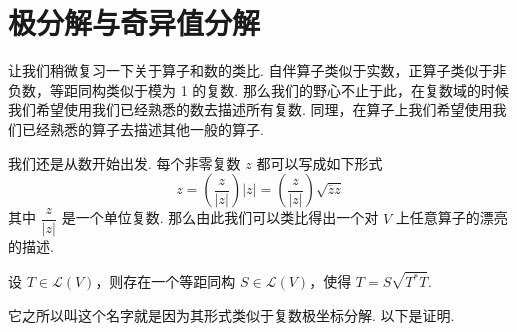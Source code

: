 \chapter{极分解与奇异值分解}

让我们稍微复习一下关于算子和数的类比. 自伴算子类似于实数，正算子类似于非负数，等距同构类似于模为 1 的复数. 那么我们的野心不止于此，在复数域的时候我们希望使用我们已经熟悉的数去描述所有复数. 同理，在算子上我们希望使用我们已经熟悉的算子去描述其他一般的算子.


我们还是从数开始出发. 每个非零复数 $ z $ 都可以写成如下形式
\[ z = \left(\frac{z}{\lvert z \rvert}\right)\lvert z \rvert = \left(\frac{z}{\lvert z \rvert}\right)\sqrt{\overline{z}z} \]
其中 $ \dfrac{z}{\lvert z \rvert} $ 是一个单位复数. 那么由此我们可以类比得出一个对 $ V $ 上任意算子的漂亮的描述.

\begin{theorem}[极分解定理] 
    设 $ T \in \mathcal{L}(V) $，则存在一个等距同构 $ S \in \mathcal{L}(V) $，使得 $ T = S\sqrt{T^*T} $.
\end{theorem}

它之所以叫这个名字就是因为其形式类似于复数极坐标分解. 以下是证明.

